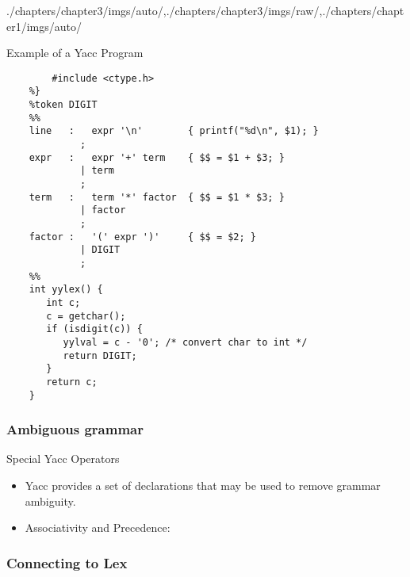 \begin{graphicspathcontext}{{./chapters/chapter3/imgs/auto/},{./chapters/chapter3/imgs/raw/},{./chapters/chapter1/imgs/auto/}}
\begin{bibunit}[apalike]
\begin{frame}[fragile]{Example of a Yacc Program}
	\vspace{-.24cm}
	\begin{lstlisting}[style=lststyle-c,basicstyle=\tiny]
	%{
	    #include <ctype.h>
	%}
	%token DIGIT
	%%
	line   :   expr '\n'        { printf("%d\n", $1); }
	         ;
	expr   :   expr '+' term    { $$ = $1 + $3; }
	         | term
	         ;
	term   :   term '*' factor  { $$ = $1 * $3; }
	         | factor
	         ;
	factor :   '(' expr ')'     { $$ = $2; }
	         | DIGIT
	         ;
	%%
	int yylex() {
	   int c;
	   c = getchar();
	   if (isdigit(c)) {
	      yylval = c - '0'; /* convert char to int */
	      return DIGIT;
	   }
	   return c;
	}
	\end{lstlisting}
\end{frame}

\subsubsection{Ambiguous grammar}
\subsubsectiontableofcontentslide

\begin{frame}{Special Yacc Operators}
	\begin{itemize}
	\item Yacc provides a set of declarations that may be used to remove grammar ambiguity.
	\vfill
	\item Associativity and Precedence:
	\end{itemize}
\end{frame}

\subsubsection{Connecting to Lex}
\subsubsectiontableofcontentslide


\end{bibunit}
\end{graphicspathcontext}
